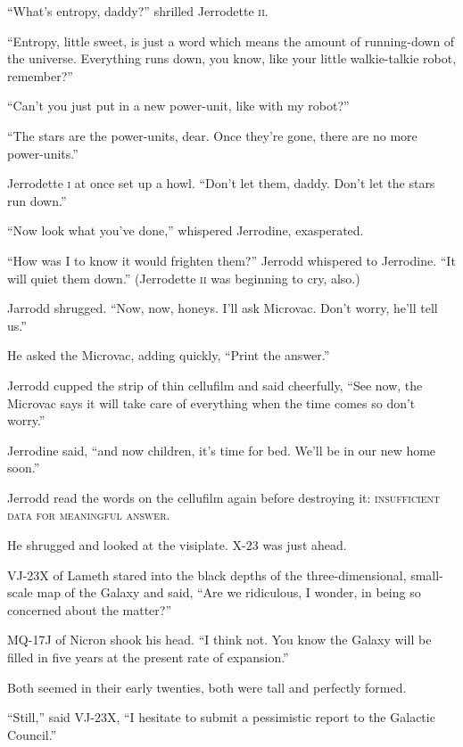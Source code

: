 \enquote{What's entropy, daddy?} shrilled Jerrodette \textsc{ii}.

\enquote{Entropy, little sweet, is just a word which means the amount of running-down of the universe. Everything runs down, you know, like your little walkie-talkie robot, remember?}

\enquote{Can't you just put in a new power-unit, like with my robot?}

\enquote{The stars are the power-units, dear. Once they're gone, there are no more power-units.}

Jerrodette \textsc{i} at once set up a howl. \enquote{Don't let them, daddy. Don't let the stars run down.}

\enquote{Now look what you've done,} whispered Jerrodine, exasperated.

\enquote{How was I to know it would frighten them?} Jerrodd whispered to Jerrodine. \enquote{It will quiet them down.} (Jerrodette \textsc{ii} was beginning to cry, also.)

Jarrodd shrugged. \enquote{Now, now, honeys. I'll ask Microvac. Don't worry, he'll tell us.}

He asked the Microvac, adding quickly, \enquote{Print the answer.}

Jerrodd cupped the strip of thin cellufilm and said cheerfully, \enquote{See now, the Microvac says it will take care of everything when the time comes so don't worry.}

Jerrodine said, \enquote{and now children, it's time for bed. We'll be in our new home soon.}

Jerrodd read the words on the cellufilm again before destroying it: \textsc{insufficient data for meaningful answer}.

He shrugged and looked at the visiplate. X-23 was just ahead.

\medskip

VJ-23X of Lameth stared into the black depths of the three-dimensional, small-scale map of the Galaxy and said, \enquote{Are we ridiculous, I wonder, in being so concerned about the matter?}

MQ-17J of Nicron shook his head. \enquote{I think not. You know the Galaxy will be filled in five years at the present rate of expansion.}

Both seemed in their early twenties, both were tall and perfectly formed.

\enquote{Still,} said VJ-23X, \enquote{I hesitate to submit a pessimistic report to the Galactic Council.}

